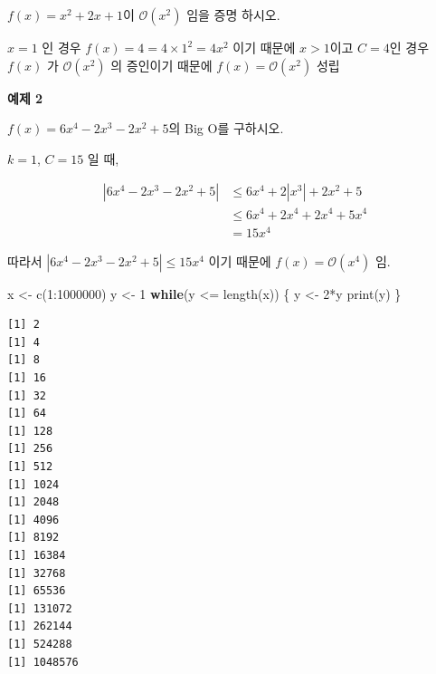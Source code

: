 \documentclass[
  11pt,
]{krantz}
\makeatletter
\newenvironment{Shaded}{\begin{snugshade}}{\end{snugshade}}
\newcommand{\ControlFlowTok}[1]{\textcolor[rgb]{0.27,0.27,0.27}{\textbf{#1}}}
\newcommand{\DecValTok}[1]{\textcolor[rgb]{0.06,0.06,0.06}{#1}}
\newcommand{\FunctionTok}[1]{\textcolor[rgb]{0,0,0}{#1}}
\newcommand{\NormalTok}[1]{#1}
\newcommand{\OtherTok}[1]{\textcolor[rgb]{0.37,0.37,0.37}{#1}}
\newcommand{\SpecialCharTok}[1]{\textcolor[rgb]{0,0,0}{#1}}
\newenvironment{kframe}{%
\medskip{}
\setlength{\fboxsep}{.8em}
 \def\at@end@of@kframe{}%
 \ifinner\ifhmode%
  \def\at@end@of@kframe{\end{minipage}}%
  \begin{minipage}{\columnwidth}%
 \fi\fi%
 \def\FrameCommand##1{\hskip\@totalleftmargin \hskip-\fboxsep
 \colorbox{shadecolor}{##1}\hskip-\fboxsep
     \hskip-\linewidth \hskip-\@totalleftmargin \hskip\columnwidth}%
 \MakeFramed {\advance\hsize-\width
   \@totalleftmargin\z@ \linewidth\hsize
   \@setminipage}}%
 {\par\unskip\endMakeFramed%
 \at@end@of@kframe}
\renewenvironment{quote}{\begin{kframe}}{\end{kframe}}
\makeatother
\begin{document}
\(f(x) = x^2 + 2x + 1\)이 \(\mathcal{O}(x^2)\) 임을 증명 하시오.

\begin{quote}
\(x = 1\) 인 경우 \(f(x) = 4 = 4\times 1^2 = 4x^2\) 이기 때문에
\(x > 1\)이고 \(C = 4\)인 경우 \(f(x)\) 가 \(\mathcal{O}(x^2)\) 의 증인이기 때문에
\(f(x) = \mathcal{O}(x^2)\) 성립
\end{quote}

\textbf{예제 2}

\(f(x) = 6x^4 -2x^3 - 2x^2 + 5\)의 Big O를 구하시오.

\begin{quote}
\(k = 1\), \(C = 15\) 일 때,
\end{quote}

\[
\begin{aligned}
|6x^4 -2x^3 - 2x^2 + 5| &\leq 6x^4 +2|x^3| + 2x^2 + 5 \\
                        &\leq 6x^4 + 2x^4 + 2x^4 + 5x^4 \\
                        &= 15x^4 
\end{aligned}
\]

따라서 \(|6x^4 -2x^3 - 2x^2 + 5| \leq 15x^4\) 이기 때문에
\(f(x) = \mathcal{O}(x^4)\) 임.

\footnotesize

\begin{Shaded}
\begin{Highlighting}[]
\NormalTok{x }\OtherTok{\textless{}{-}} \FunctionTok{c}\NormalTok{(}\DecValTok{1}\SpecialCharTok{:}\DecValTok{1000000}\NormalTok{)}
\NormalTok{y }\OtherTok{\textless{}{-}} \DecValTok{1}
\ControlFlowTok{while}\NormalTok{(y }\SpecialCharTok{\textless{}=} \FunctionTok{length}\NormalTok{(x)) \{}
\NormalTok{    y }\OtherTok{\textless{}{-}} \DecValTok{2}\SpecialCharTok{*}\NormalTok{y}
    \FunctionTok{print}\NormalTok{(y)}
\NormalTok{\}}
\end{Highlighting}
\end{Shaded}

\begin{verbatim}
[1] 2
[1] 4
[1] 8
[1] 16
[1] 32
[1] 64
[1] 128
[1] 256
[1] 512
[1] 1024
[1] 2048
[1] 4096
[1] 8192
[1] 16384
[1] 32768
[1] 65536
[1] 131072
[1] 262144
[1] 524288
[1] 1048576
\end{verbatim}

\normalsize
\end{document}
